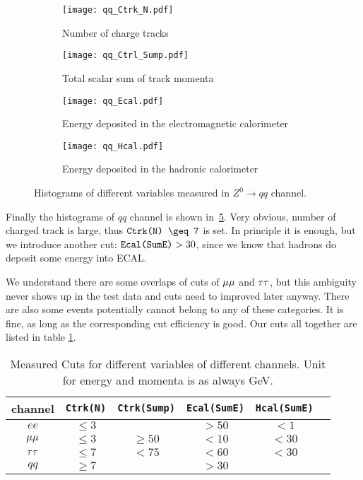 \begin{figure}[H]  
	\begin{subfigure}[t]{0.5\textwidth}
	\begin{center}
		\texttt{[image: qq\_Ctrk\_N.pdf]}
	\end{center}
	\caption{Number of charge tracks}
	\label{fig:}
	\end{subfigure}%
	\begin{subfigure}[t]{0.5\textwidth}
	\begin{center}
		\texttt{[image: qq\_Ctrl\_Sump.pdf]}
	\end{center}
	\caption{Total scalar sum of track momenta}
	\label{fig:}
	\end{subfigure}
	
	\begin{subfigure}[t]{0.5\textwidth}
	\begin{center}
		\texttt{[image: qq\_Ecal.pdf]}
	\end{center}
	\caption{Energy deposited in the electromagnetic calorimeter}
	\label{fig:}
	\end{subfigure}%
	\begin{subfigure}[t]{0.5\textwidth}
	\begin{center}
		\texttt{[image: qq\_Hcal.pdf]}
	\end{center}
	\caption{Energy deposited in the hadronic calorimeter}
	\label{fig:}
	\end{subfigure}
	\caption{Histograms of different variables measured in $  {Z}^0\rightarrow qq $ channel. }
	\label{Fig:histograms_qq}
\end{figure}
Finally the histograms of $qq$ channel is shown in~\ref{Fig:histograms_qq}. Very obvious, number of charged track is large, thus $\verb|Ctrk(N) \geq 7|$ is set. In principle it is enough, but we introduce another cut: $\verb|Ecal(SumE)| > 30$, since we know that hadrons do deposit some energy into ECAL.

We understand there are some overlaps of cuts of $\mu\mu$ and $\tau\tau$, but this ambiguity never shows up in the test data and cuts need to improved later anyway. There are also some events potentially cannot belong to any of these categories. It is fine, as long as the corresponding cut efficiency is good. Our cuts all together are listed in table \ref{Tab:cuts}.
\begin{table}[H]
	\centering
	\begin{tabular}{ccc ccc}
		\toprule
		channel & \verb|Ctrk(N)| & \verb|Ctrk(Sump)| & \verb|Ecal(SumE)| & \verb|Hcal(SumE)| \\
		\midrule
		$ee$ & $ \le 3$  &   &    $ > 50$  & $<1$	\\
		$\mu\mu$ &  $ \le 3$  &  $ \ge 50$  &    $< 10$  & $< 30$	\\
		$\tau\tau$ &  $ \le 7$  & $< 75$  & $ < 60$    & $< 30$	\\
		$qq$ &  $ \ge 7$ &   &  $> 30$    &	\\
		\bottomrule
	\end{tabular}
	\caption{Measured Cuts for different variables of different channels. Unit for energy and momenta is as always \si{\giga\eV}.}
	\label{Tab:cuts}
\end{table}
